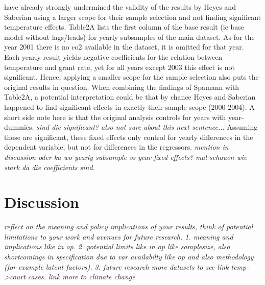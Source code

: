\documentclass[11pt]{article}
\begin{document}
	\cite{Spamann.2020} have already strongly undermined the validity of the results by Heyes and Saberian using a larger scope for their sample selection and not finding significant temperature effects. Table2A lists the first column of the base result (ie base model without lags/leads) for yearly subsamples of the main dataset. As for the year 2001 there is no co2 available in the dataset, it is omitted for that year. Each yearly result yields negative coefficients for the relation between temperature and grant rate, yet for all years except 2003 this effect is not significant. Hence, applying a smaller scope for the sample selection also puts the original results in question. When combining the findings of Spamann with Table2A, a potential interpretation could be that by chance Heyes and Saberian happened to find significant effects in exactly their sample scope (2000-2004). A short side note here is that the original analysis controls for years with year-dummies. \textit{sind die significant? also not sure about this next sentence...} Assuming those are significant, these fixed effects only control for yearly differences in the dependent variable, but not for differences in the regressors. \textit{mention in discussion oder ka wo yearly subsample vs year fixed effects? mal schauen wie stark da die coefficients sind.}

\section{Discussion}
\textit{reflect on the meaning and policy implications of your results, think of potential limitations to your work and avenues for future research.
	1. meaning and implications like in op. 
	2. potential limits like in op like samplesize, also shortcomings in specification due to var availabilty like op and also methodology (for example latent factors).
	3. future research more datasets to see link temp->court cases. link more to climate change
}
\end{document}
